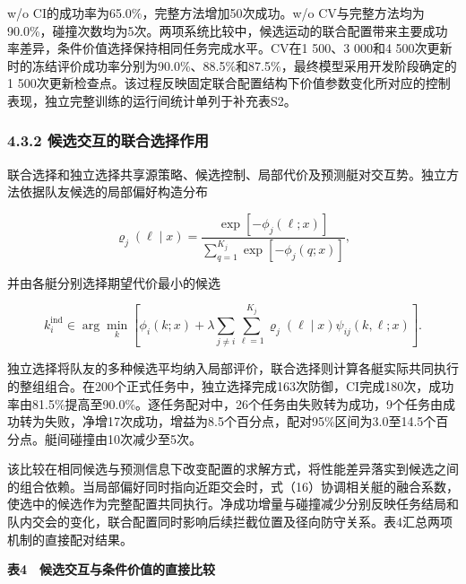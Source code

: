 \documentclass[UTF8,a4paper,zihao=5,fontset=none]{ctexart}
\begin{document}
w/o CI的成功率为65.0\%，完整方法增加50次成功。w/o
CV与完整方法均为90.0\%，碰撞次数均为5次。两项系统比较中，候选运动的联合配置带来主要成功率差异，条件价值选择保持相同任务完成水平。CV在1
500、3 000和4
500次更新时的冻结评价成功率分别为90.0\%、88.5\%和87.5\%，最终模型采用开发阶段确定的1
500次更新检查点。该过程反映固定联合配置结构下价值参数变化所对应的控制表现，独立完整训练的运行间统计单列于补充表S2。

\subsubsection*{4.3.2
候选交互的联合选择作用}

联合选择和独立选择共享源策略、候选控制、局部代价及预测艇对交互势。独立方法依据队友候选的局部偏好构造分布

\[
\varrho_j(\ell\mid x)
=\frac{\exp[-\phi_j(\ell;x)]}
{\sum_{q=1}^{K_j}\exp[-\phi_j(q;x)]},
\tag{39}
\]

并由各艇分别选择期望代价最小的候选

\[
k_i^{\mathrm{ind}}\in\arg\min_k
\left[\phi_i(k;x)+\lambda\sum_{j\ne i}\sum_{\ell=1}^{K_j}
\varrho_j(\ell\mid x)\psi_{ij}(k,\ell;x)\right].
\tag{40}
\]

独立选择将队友的多种候选平均纳入局部评价，联合选择则计算各艇实际共同执行的整组组合。在200个正式任务中，独立选择完成163次防御，CI完成180次，成功率由81.5\%提高至90.0\%。逐任务配对中，26个任务由失败转为成功，9个任务由成功转为失败，净增17次成功，增益为8.5个百分点，配对95\%区间为3.0至14.5个百分点。艇间碰撞由10次减少至5次。

该比较在相同候选与预测信息下改变配置的求解方式，将性能差异落实到候选之间的组合依赖。当局部偏好同时指向近距交会时，式（16）协调相关艇的融合系数，使选中的候选作为完整配置共同执行。净成功增量与碰撞减少分别反映任务结局和队内交会的变化，联合配置同时影响后续拦截位置及径向防守关系。表4汇总两项机制的直接配对结果。

\begin{center}\small\bfseries 表4　候选交互与条件价值的直接比较\end{center}
\end{document}
